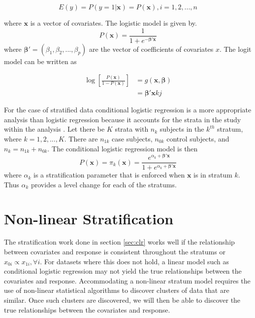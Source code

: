 \documentclass[twoside,11pt]{article}
\begin{document}
 \begin{equation} \label{eqn:probx}
E(y)= P(y=1|\mathbf{x})=P(\mathbf{x}), i =1,2,...,n
\end{equation}

where $\mathbf{x}$ is a vector of covariates. The logistic model is given by. 
\begin{equation} \label{eqn:logisticfunction}
P(\mathbf{x})= \frac{1}{1+e^{-\mathbf{\beta}'\mathbf{x}}}
\end{equation}
where $\mathbf{\beta}'=(\beta_1,\beta_2,...,\beta_p)$ are the vector of coefficients of covariates $x$. The logit model can be written as 

\begin{equation} \label{eqn:logisticmodel}
\begin{array}{cc}
\log \left[ \frac{P(\mathbf{x})}{1-P(\mathbf{x})} \right]  &= g(\mathbf{x},\mathbf{\beta})\\
&= \mathbf{\beta}'\mathbf{x}kj
\end{array}
\end{equation}

For the case of stratified data conditional logistic regression is a more appropriate analysis than logistic regression because it accounts for the strata in the study within the analysis \citep{Jewell04}. Let there be $K$ strata with $n_k$ subjects in the $k^{th}$ stratum, where $k=1,2,...,K$. There are $n_{1k}$ case subjects, $n_{0k}$ control subjects, and $n_k=n_{1k}+n_{0k}$. The conditional logistic regression model is then 
\begin{equation} \label{eqn:clrmodel}
P(\mathbf{x})=\pi_k(\mathbf{x})= \frac{e^{\alpha_k + \mathbf{\beta}'\mathbf{x}}}{1+e^{\alpha_k + \mathbf{\beta}'\mathbf{x}}}
\end{equation}
where $\alpha_k$ is a stratification parameter that is enforced when $\mathbf{x}$ is in stratum $k$. Thus $\alpha_k$ provides a level change for each of the stratums. 

\section{Non-linear Stratification}
The stratification work done in section \ref{sec:clr} works well if the relationship between covariates and response is consistent throughout the stratums or $x_{0i} \propto x_{1i}, \forall i$. For datasets where this does not hold, a linear model such as conditional logistic regression may not yield the true relationships between the covariates and response. Accommodating a non-linear stratum model requires the use of non-linear statistical algorithms to discover clusters of data that are similar. Once such clusters are discovered, we will then be able to discover the true relationships between the covariates and response. 
\end{document}
